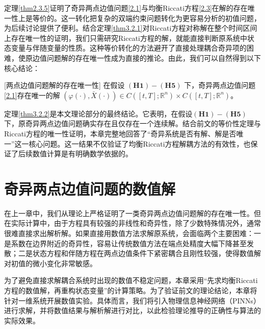 \documentclass{GZUbachelorthesis}
\begin{document}
\vspace{1em}
定理\ref{thm2.3.5}证明了奇异两点边值问题\eqref{2.1}与均衡Riccati方程\eqref{2.3}在解的存在唯一性上是等价的。这一转化把复杂的双端约束问题转化为更容易分析的初值问题，为后续讨论提供了便利。结合定理\ref{thm3.2.1}对Riccati方程对称解在整个时间区间上存在唯一性的证明，我们只需研究Riccati方程的解，就能直接判断原系统中状态变量与伴随变量的性质。这种等价转化的方法避开了直接处理耦合奇异项的困难，使原边值问题解的存在唯一性成为直接的推论。由此，我们可以自然得到以下核心结论：\vspace{1em}
\begin{thm}\label{thm3.2.2}[两点边值问题解的存在唯一性]
	在假设 $\mathbf{(H1)-(H5)}$ 下，奇异两点边值问题\eqref{2.1}存在唯一的解 $(\varphi(\cdot),\bar{X}(\cdot)) \in C([t,T];\mathbb{R}^n)\times C([t,T];\mathbb{R}^n)$。
\end{thm}
\vspace{1em}
定理\ref{thm3.2.2}是本文理论部分的最终结论。它表明，在假设$\mathbf{(H1)-(H5)}$下，原奇异两点边值问题确实存在且仅存在一个连续解。结合前文的等价性定理与Riccati方程的唯一性证明，本章完整地回答了“奇异系统是否有解、解是否唯一”这一核心问题。这一结果不仅验证了均衡Riccati方程解耦方法的有效性，也保证了后续数值计算是有明确数学依据的。
\newpage
\section{奇异两点边值问题的数值解}

在上一章中，我们从理论上严格证明了一类奇异两点边值问题解的存在唯一性。但在实际计算中，由于方程具有较强的非线性和奇异性，除了少数特殊情况外，通常很难直接求出解析解。如果直接用数值方法求解原系统，会面临两个主要困难：一是系数在边界附近的奇异性，容易让传统数值方法在端点处精度大幅下降甚至发散；二是状态方程和伴随方程在两点边值条件下紧密耦合且刚性较强，使得数值解对初值的微小变化非常敏感。

为了避免直接求解耦合系统时出现的数值不稳定问题，本章采用“先求均衡Riccati方程的数值解，再重构状态变量”的计算策略。为了验证前文的理论结论，本章将针对一维系统开展数值实验。具体而言，我们将引入物理信息神经网络（PINNs）进行求解，并将数值结果与解析解进行对比，以此检验理论推导的正确性与算法的实际效果。
\end{document}
